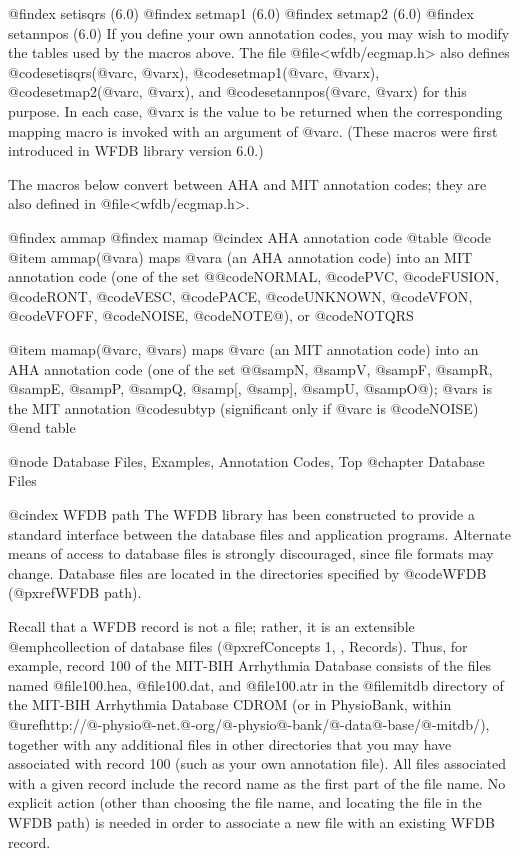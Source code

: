 {{{{{{{{{{{{{{@findex setisqrs (6.0)
@findex setmap1 (6.0)
@findex setmap2 (6.0)
@findex setannpos (6.0)
If you define your own annotation codes, you may wish to modify the
tables used by the macros above.  The file @file{<wfdb/ecgmap.h>} also defines
@code{setisqrs(@var{c}, @var{x})}, @code{setmap1(@var{c}, @var{x})},
@code{setmap2(@var{c}, @var{x})}, and @code{setannpos(@var{c}, @var{x})}
for this purpose.  In each case, @var{x} is the value to be returned
when the corresponding mapping macro is invoked with an argument of
@var{c}.  (These macros were first introduced in WFDB library version
6.0.)

The macros below convert between AHA and MIT annotation codes;  they are
also defined in @file{<wfdb/ecgmap.h>}.

@findex ammap
@findex mamap
@cindex AHA annotation code
@table @code
@item ammap(@var{a})
maps @var{a} (an AHA annotation code) into an MIT annotation code
(one of the set @{@code{NORMAL}, @code{PVC}, @code{FUSION}, @code{RONT},
@code{VESC}, @code{PACE}, @code{UNKNOWN}, @code{VFON}, @code{VFOFF},
@code{NOISE}, @code{NOTE}@}), or @code{NOTQRS}

@item mamap(@var{c}, @var{s})
maps @var{c} (an MIT annotation code) into an AHA annotation code
(one of the set @{@samp{N}, @samp{V}, @samp{F}, @samp{R}, @samp{E},
@samp{P}, @samp{Q}, @samp{[}, @samp{]}, @samp{U}, @samp{O}@}); @var{s}
is the MIT annotation @code{subtyp} (significant only if @var{c} is
@code{NOISE})
@end table

@node     Database Files, Examples, Annotation Codes, Top
@chapter Database Files

@cindex WFDB path
The WFDB library has been constructed to provide a standard interface
between the database files and application programs.  Alternate means of
access to database files is strongly discouraged, since file formats may
change.  Database files are located in the directories specified by
@code{WFDB} (@pxref{WFDB path}).

Recall that a WFDB record is not a file; rather, it is an extensible
@emph{collection} of database files (@pxref{Concepts 1, , Records}).  Thus, for
example, record 100 of the MIT-BIH Arrhythmia Database consists of the files
named @file{100.hea}, @file{100.dat}, and @file{100.atr} in the @file{mitdb}
directory of the MIT-BIH Arrhythmia Database CDROM (or in PhysioBank, within
@uref{http://@-physio@-net.@-org/@-physio@-bank/@-data@-base/@-mitdb/}),
together with any additional files in other directories that you may have
associated with record 100 (such as your own annotation file).  All files
associated with a given record include the record name as the first part of the
file name.  No explicit action (other than choosing the file name, and locating
the file in the WFDB path) is needed in order to associate a new file with an
existing WFDB record.

}}}}}}}}}}}}}}
